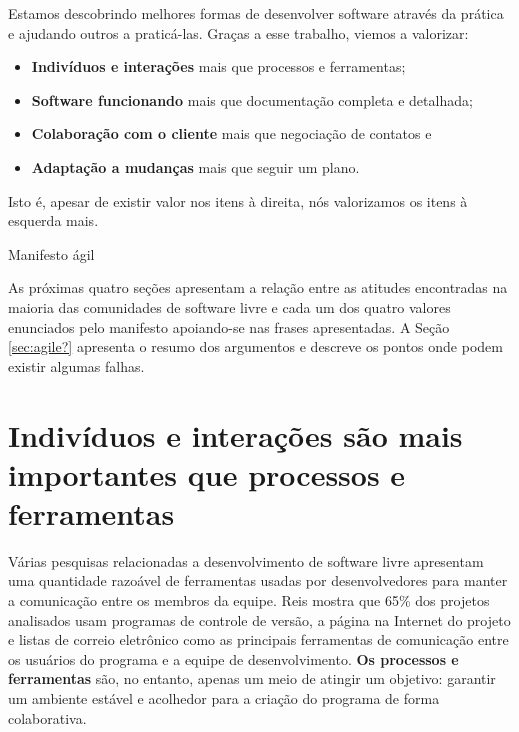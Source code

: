 \begin{caixa}[hb]
  \begin{minipage}{\linewidth}
    \centering Estamos descobrindo melhores formas de desenvolver
    software através da prática e ajudando outros a
    praticá-las. Graças a esse trabalho, viemos a valorizar:

    \begin{center}
      \begin{itemize}
      \item \textbf{Indivíduos e interações} mais que processos e
        ferramentas;
      \item \textbf{Software funcionando} mais que documentação
        completa e detalhada;
      \item \textbf{Colaboração com o cliente} mais que negociação de
        contatos e
      \item \textbf{Adaptação a mudanças} mais que seguir um plano.
      \end{itemize}
    \end{center}

    Isto é, apesar de existir valor nos itens à direita, nós
    valorizamos os itens à esquerda mais.
  \end{minipage}
  \caption{Manifesto ágil}
  \label{box:manifesto}
\end{caixa}

As próximas quatro seções apresentam a relação entre as atitudes
encontradas na maioria das comunidades de software livre e cada um dos
quatro valores enunciados pelo manifesto apoiando-se nas frases
apresentadas. A Seção \ref{sec:agile?} apresenta o resumo dos
argumentos e descreve os pontos onde podem existir algumas falhas.

\section{Indivíduos e interações são mais importantes que processos e
  ferramentas}
\label{sec:first-princ}

Várias pesquisas relacionadas a desenvolvimento de software livre
apresentam uma quantidade razoável de ferramentas usadas por
desenvolvedores para manter a comunicação entre os membros da
equipe. Reis \cite{Reis2003} mostra que 65\% dos projetos analisados
usam programas de controle de versão, a página na Internet do projeto
e listas de correio eletrônico como as principais ferramentas de
comunicação entre os usuários do programa e a equipe de
desenvolvimento. \textbf{Os processos e ferramentas} são, no entanto,
apenas um meio de atingir um objetivo: garantir um ambiente estável e
acolhedor para a criação do programa de forma colaborativa.

